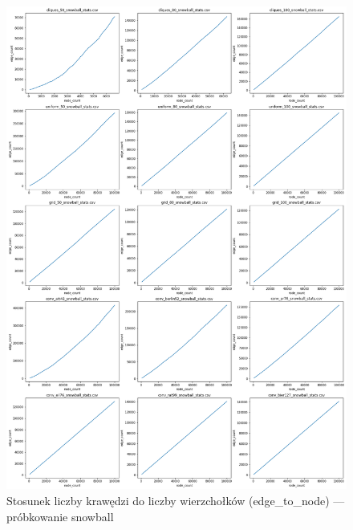 \begin{figure}[]
    \centering
    \includegraphics[width=\textwidth]{chapters/experiments/img/merged_plots/main_snowball/edge_count.png}
    \caption{Stosunek liczby krawędzi do liczby wierzchołków (edge\_to\_node) --- próbkowanie snowball}
    \label{fig:included_snowball_edges}
\end{figure}

